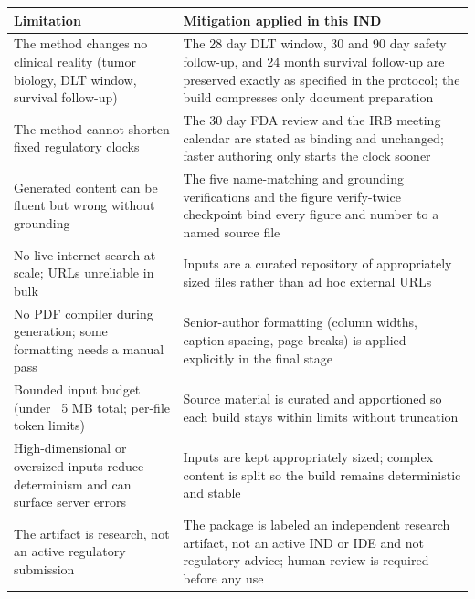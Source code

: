\vspace{0.2em}
\noindent\begin{tabularx}{\textwidth}{L{4.8cm} Y}
\toprule
\textbf{Limitation} & \textbf{Mitigation applied in this IND} \\
\midrule
The method changes no clinical reality (tumor biology, DLT window, survival follow-up) & The 28 day DLT window, 30 and 90 day safety follow-up, and 24 month survival follow-up are preserved exactly as specified in the protocol; the build compresses only document preparation \\
The method cannot shorten fixed regulatory clocks & The 30 day FDA review and the IRB meeting calendar are stated as binding and unchanged; faster authoring only starts the clock sooner \\
Generated content can be fluent but wrong without grounding & The five name-matching and grounding verifications and the figure verify-twice checkpoint bind every figure and number to a named source file \\
No live internet search at scale; URLs unreliable in bulk & Inputs are a curated repository of appropriately sized files rather than ad hoc external URLs \\
No PDF compiler during generation; some formatting needs a manual pass & Senior-author formatting (column widths, caption spacing, page breaks) is applied explicitly in the final stage \\
Bounded input budget (under ~5 MB total; per-file token limits) & Source material is curated and apportioned so each build stays within limits without truncation \\
High-dimensional or oversized inputs reduce determinism and can surface server errors & Inputs are kept appropriately sized; complex content is split so the build remains deterministic and stable \\
The artifact is research, not an active regulatory submission & The package is labeled an independent research artifact, not an active IND or IDE and not regulatory advice; human review is required before any use \\
\bottomrule
\end{tabularx}

